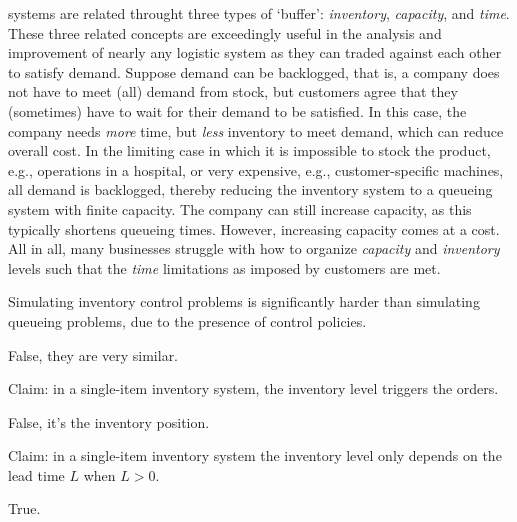 \documentclass[stochastic-or.tex]{subfiles}
\begin{document}
 systems are related throught three types of `buffer': \emph{inventory}, \emph{capacity}, and \emph{time}.
These three related concepts are exceedingly useful
in the analysis and improvement of nearly any logistic system as they can traded against each other to satisfy demand.
Suppose demand can be backlogged, that is, a company does not have to meet (all) demand from stock, but customers agree that they (sometimes) have to wait for their demand to be satisfied.
In this case, the company needs \emph{more} time, but \emph{less} inventory to meet demand, which can reduce overall cost.
In the limiting case in which it is impossible to stock the product, e.g., operations in a hospital, or very expensive, e.g., customer-specific machines, all demand is backlogged, thereby reducing the inventory system to a queueing system with finite capacity.
The company can still increase capacity, as this typically shortens queueing times.
However, increasing capacity comes at a cost.
All in all, many businesses struggle with how to organize \emph{capacity} and \emph{inventory} levels such that the \emph{time} limitations as imposed by customers are met.





\begin{truefalse}
    Simulating inventory control problems is significantly harder than simulating queueing problems, due to the presence of control policies.
    \begin{solution}
        False,  they are very similar.
    \end{solution}
\end{truefalse}

\begin{truefalse}
Claim: in a single-item inventory system, the inventory level triggers the orders.
    \begin{solution}
        False, it's the inventory position.
    \end{solution}
\end{truefalse}

\begin{truefalse}
Claim: in a single-item inventory system the inventory level only depends on the lead time $L$ when $L>0$.
    \begin{solution}
        True.
    \end{solution}
\end{truefalse}
\end{document}
